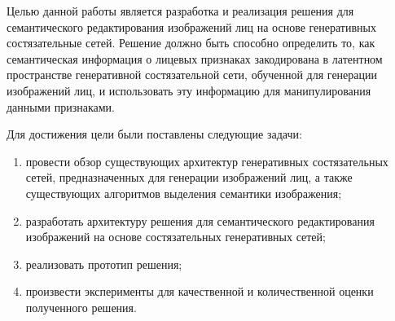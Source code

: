 Целью данной работы является разработка и реализация решения для семантического редактирования изображений лиц на основе генеративных состязательные сетей. 
Решение должно быть способно определить то, как семантическая информация о лицевых признаках закодирована в латентном пространстве генеративной состязательной сети, обученной для генерации изображений лиц, и использовать эту информацию для манипулирования данными признаками.

Для достижения цели были поставлены следующие задачи:

\begin{enumerate}
\item провести обзор существующих архитектур генеративных состязательных сетей, предназначенных для генерации изображений лиц, а также существующих алгоритмов выделения семантики изображения;
\item разработать архитектуру решения для семантического редактирования изображений  на основе состязательных генеративных сетей;
\item реализовать прототип решения;
\item произвести эксперименты для качественной и количественной оценки полученного решения.
\end{enumerate}
